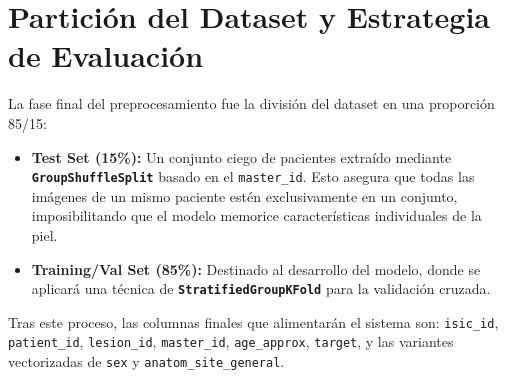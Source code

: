 \section{Partición del Dataset y Estrategia de Evaluación}

La fase final del preprocesamiento fue la división del dataset en una proporción 85/15:
\begin{itemize}
	\item \textbf{Test Set (15\%):} Un conjunto ciego de pacientes extraído mediante \textbf{\texttt{GroupShuffleSplit}} basado en el \texttt{master\_id}. Esto asegura que todas las imágenes de un mismo paciente estén exclusivamente en un conjunto, imposibilitando que el modelo memorice características individuales de la piel.
	\item \textbf{Training/Val Set (85\%):} Destinado al desarrollo del modelo, donde se aplicará una técnica de \textbf{\texttt{StratifiedGroupKFold}} para la validación cruzada.
\end{itemize}

Tras este proceso, las columnas finales que alimentarán el sistema son: \texttt{isic\_id}, \texttt{patient\_id}, \texttt{lesion\_id}, \texttt{master\_id}, \texttt{age\_approx}, \texttt{target}, y las variantes vectorizadas de \texttt{sex} y \texttt{anatom\_site\_general}.